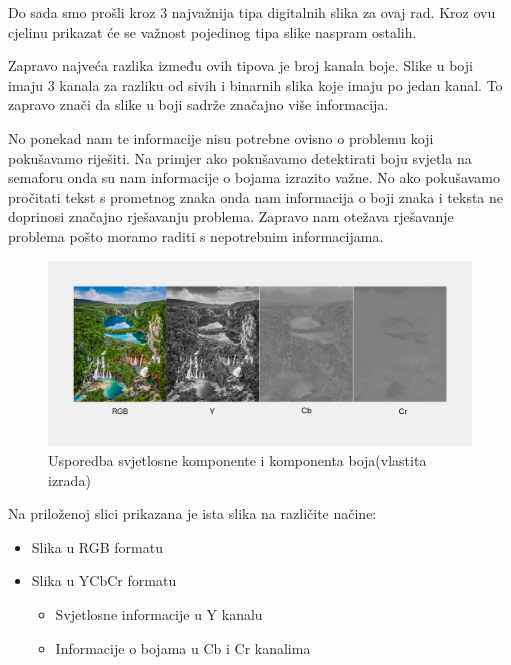 \documentclass{foi}
\begin{document}
Do sada smo prošli kroz 3 najvažnija tipa digitalnih slika za ovaj rad. Kroz ovu cjelinu prikazat će se važnost pojedinog tipa slike naspram ostalih.

Zapravo najveća razlika između ovih tipova je broj kanala boje. Slike u boji imaju 3 kanala za razliku od sivih i binarnih slika koje imaju po jedan kanal. To zapravo znači da slike u boji sadrže značajno više informacija. 

No ponekad nam te informacije nisu potrebne ovisno o problemu koji pokušavamo riješiti. Na primjer ako pokušavamo detektirati boju svjetla na semaforu onda su nam informacije o bojama izrazito važne. No ako pokušavamo pročitati tekst s prometnog znaka onda nam informacija o boji znaka i teksta ne doprinosi značajno rješavanju problema. Zapravo nam otežava rješavanje problema pošto moramo raditi s nepotrebnim informacijama.

\begin{figure}[H]
    \centering
    \includegraphics[width=1.0\linewidth]{slike/Luminace vs chrominance.png}
    \caption{Usporedba svjetlosne komponente i komponenta boja(vlastita izrada)}
\end{figure}

\begin{flushleft}
    Na priloženoj slici prikazana je ista slika na različite načine:
    \begin{itemize}[label=•]
        \item Slika u RGB formatu
        \item Slika u YCbCr formatu
        \begin{itemize}[label=•]
            \item Svjetlosne informacije u Y kanalu
            \item Informacije o bojama u Cb i Cr kanalima
        \end{itemize}
    \end{itemize}
    \end{flushleft}
\end{document}

